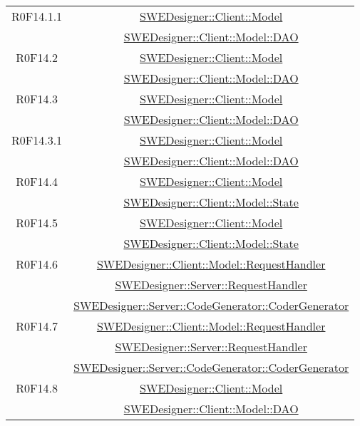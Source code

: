 \documentclass[../SpecificaTecnica.tex]{subfiles}
\begin{document}
\begin{longtable}{|c|c|}
		R0F14.1.1 & \hyperlink{SWEDesigner::Client::Model}{SWEDesigner::Client::Model} \\& \hyperlink{SWEDesigner::Client::Model::DAO}{SWEDesigner::Client::Model::DAO}\\\hline
		R0F14.2 & \hyperlink{SWEDesigner::Client::Model}{SWEDesigner::Client::Model} \\& \hyperlink{SWEDesigner::Client::Model::DAO}{SWEDesigner::Client::Model::DAO}\\\hline
		R0F14.3 & \hyperlink{SWEDesigner::Client::Model}{SWEDesigner::Client::Model} \\& \hyperlink{SWEDesigner::Client::Model::DAO}{SWEDesigner::Client::Model::DAO}\\\hline
		R0F14.3.1 & \hyperlink{SWEDesigner::Client::Model}{SWEDesigner::Client::Model} \\& \hyperlink{SWEDesigner::Client::Model::DAO}{SWEDesigner::Client::Model::DAO}\\\hline
		R0F14.4 & \hyperlink{SWEDesigner::Client::Model}{SWEDesigner::Client::Model} \\& \hyperlink{SWEDesigner::Client::Model::State}{SWEDesigner::Client::Model::State}\\\hline
		R0F14.5 & \hyperlink{SWEDesigner::Client::Model}{SWEDesigner::Client::Model} \\& \hyperlink{SWEDesigner::Client::Model::State}{SWEDesigner::Client::Model::State}\\\hline
		R0F14.6 & \hyperlink{SWEDesigner::Client::Model::RequestHandler}{SWEDesigner::Client::Model::RequestHandler} \\& \hyperlink{SWEDesigner::Server::RequestHandler}{SWEDesigner::Server::RequestHandler} \\& \hyperlink{SWEDesigner::Server::CodeGenerator::CoderGenerator}{SWEDesigner::Server::CodeGenerator::CoderGenerator} \\\hline
		R0F14.7 & \hyperlink{SWEDesigner::Client::Model::RequestHandler}{SWEDesigner::Client::Model::RequestHandler} \\& \hyperlink{SWEDesigner::Server::RequestHandler}{SWEDesigner::Server::RequestHandler} \\& \hyperlink{SWEDesigner::Server::CodeGenerator::CoderGenerator}{SWEDesigner::Server::CodeGenerator::CoderGenerator} \\\hline
		R0F14.8 & \hyperlink{SWEDesigner::Client::Model}{SWEDesigner::Client::Model}\\& \hyperlink{SWEDesigner::Client::Model::DAO}{SWEDesigner::Client::Model::DAO}\\\hline

\end{longtable}
\end{document}
